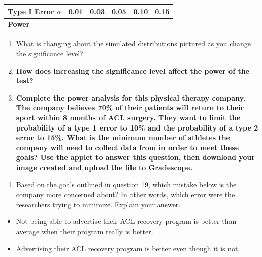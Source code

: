 \documentclass[
]{report}
\providecommand{\tightlist}{%
  \setlength{\itemsep}{0pt}\setlength{\parskip}{0pt}}
\begin{document}
\setlength\tabcolsep{0.5cm}
\begin{longtable}{|l|c|c|c|c|c|}
\hline
\textbf{Type I Error $\alpha$}& 0.01 & 0.03 & 0.05 & 0.10 & 0.15 \\ \hline
\textbf{Power} & & & & &  \\ \hline
\end{longtable}

\begin{enumerate}
\def\labelenumi{\arabic{enumi}.}
\setcounter{enumi}{16}
\item
  What is changing about the simulated distributions pictured as you change the significance level?
  \vspace{0.5in}
\item
  \textbf{How does increasing the significance level affect the power of the test?}
  \vspace{0.5in}
\item
  \textbf{Complete the power analysis for this physical therapy company. The company believes 70\% of their patients will return to their sport within 8 months of ACL surgery. They want to limit the probability of a type 1 error to 10\% and the probability of a type 2 error to 15\%. What is the minimum number of athletes the company will need to collect data from in order to meet these goals? Use the applet to answer this question, then download your image created and upload the file to Gradescope.}
  \vspace{0.25in}
\end{enumerate}

\newpage

\begin{enumerate}
\def\labelenumi{\arabic{enumi}.}
\setcounter{enumi}{19}
\tightlist
\item
  Based on the goals outlined in question 19, which mistake below is the company more concerned about? In other words, which error were the researchers trying to minimize. Explain your answer.
\end{enumerate}

\begin{itemize}
\item
  Not being able to advertise their ACL recovery program is better than average when their program really is better.
\item
  Advertising their ACL recovery program is better even though it is not.
\end{itemize}

\vspace{0.8in}
\end{document}
